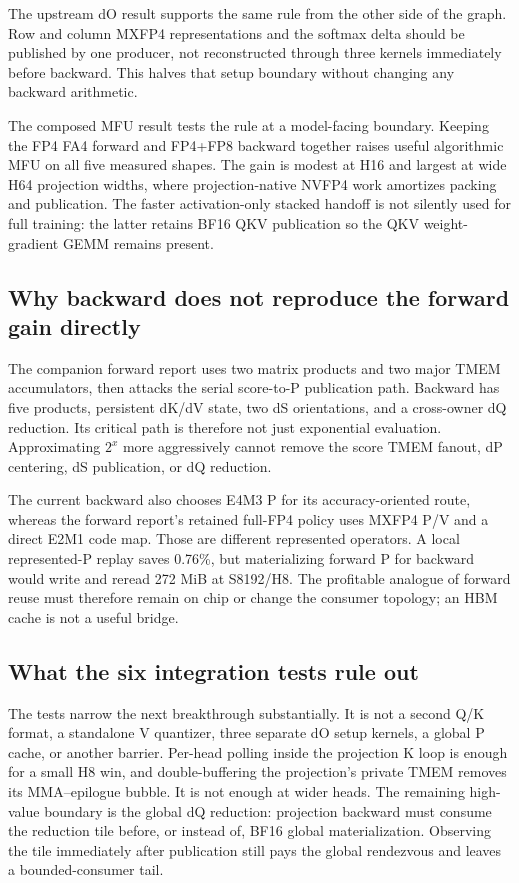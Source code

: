 The upstream dO result supports the same rule from the other side of the
graph.  Row and column MXFP4 representations and the softmax delta should be
published by one producer, not reconstructed through three kernels immediately
before backward.  This halves that setup boundary without changing any
backward arithmetic.

The composed MFU result tests the rule at a model-facing boundary.  Keeping
the FP4 FA4 forward and FP4+FP8 backward together raises useful algorithmic
MFU on all five measured shapes.  The gain is modest at H16 and largest at
wide H64 projection widths, where projection-native NVFP4 work amortizes
packing and publication.  The faster activation-only stacked handoff is not
silently used for full training: the latter retains BF16 QKV publication so
the QKV weight-gradient GEMM remains present.

\subsection{Why backward does not reproduce the forward gain directly}

The companion forward report uses two matrix products and two major TMEM
accumulators, then attacks the serial score-to-P publication path.  Backward
has five products, persistent dK/dV state, two dS orientations, and a
cross-owner dQ reduction.  Its critical path is therefore not just
exponential evaluation.  Approximating $2^x$ more aggressively cannot remove
the score TMEM fanout, dP centering, dS publication, or dQ reduction.

The current backward also chooses E4M3 P for its accuracy-oriented route,
whereas the forward report's retained full-FP4 policy uses MXFP4 P/V and a
direct E2M1 code map.  Those are different represented operators.  A local
represented-P replay saves 0.76\%, but materializing forward P for backward
would write and reread 272 MiB at S8192/H8.  The profitable analogue of
forward reuse must therefore remain on chip or change the consumer topology;
an HBM cache is not a useful bridge.

\subsection{What the six integration tests rule out}

The tests narrow the next breakthrough substantially.  It is not a second Q/K
format, a standalone V quantizer, three separate dO setup kernels, a global P
cache, or another barrier.  Per-head polling inside the projection K loop is
enough for a small H8 win, and double-buffering the projection's private TMEM
removes its MMA--epilogue bubble.  It is not enough at wider heads.  The
remaining high-value boundary is the global dQ reduction: projection backward
must consume the reduction tile before, or instead of, BF16 global
materialization.  Observing the tile immediately after publication still
pays the global rendezvous and leaves a bounded-consumer tail.

